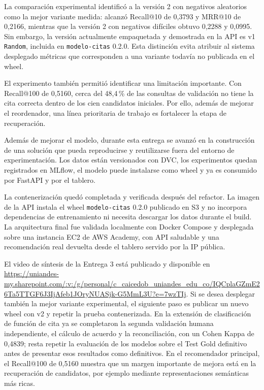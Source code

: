 \documentclass[9pt]{article}
\begin{document}
La comparación experimental identificó a la versión 2 con negativos aleatorios
como la mejor variante medida: alcanzó Recall@10 de 0,3793 y MRR@10 de 0,2166,
mientras que la versión 2 con negativos difíciles obtuvo 0,2288 y 0,0995. Sin
embargo, la versión actualmente empaquetada y demostrada en la API es v1
\texttt{Random}, incluida en \texttt{modelo-citas} 0.2.0. Esta distinción evita
atribuir al sistema desplegado métricas que corresponden a una variante todavía
no publicada en el wheel.

El experimento también permitió identificar una limitación importante. Con
Recall@100 de 0,5160, cerca del 48,4\,\% de las consultas de validación no tiene
la cita correcta dentro de los cien candidatos iniciales. Por ello, además de
mejorar el reordenador, una línea prioritaria de trabajo es fortalecer la etapa
de recuperación.

Además de mejorar el modelo, durante esta entrega se avanzó en la construcción
de una solución que pueda reproducirse y reutilizarse fuera del entorno de
experimentación. Los datos están versionados con DVC, los experimentos quedan
registrados en MLflow, el modelo puede instalarse como wheel y ya es consumido
por FastAPI y por el tablero.

La contenerización quedó completada y verificada después del refactor. La
imagen de la API instala el wheel \texttt{modelo-citas} 0.2.0 publicado en S3 y
no incorpora dependencias de entrenamiento ni necesita descargar los datos
durante el build. La arquitectura final fue validada localmente con Docker
Compose y desplegada sobre una instancia EC2 de AWS Academy, con API saludable y
una recomendación real devuelta desde el tablero servido por la IP pública.

El video de síntesis de la Entrega 3 está publicado y disponible en
\url{https://uniandes-my.sharepoint.com/:v:/g/personal/c_caicedob_uniandes_edu_co/IQCplaGZmE26Ta5TTGF6J3IjAfeb1JOryNUASjk-G5MmL3U?e=7wzTIj}.
Si se desea desplegar también la mejor variante experimental, el siguiente paso
es publicar un nuevo wheel con v2 y repetir la prueba contenerizada. En la
extensión de clasificación de función de cita ya se completaron la segunda
validación humana independiente, el cálculo de acuerdo y la reconciliación, con
un Cohen Kappa de 0,4839; resta repetir la evaluación de los modelos sobre el
Test Gold definitivo antes de presentar esos resultados como definitivos. En el recomendador principal, el Recall@100 de
0,5160 muestra que un margen importante de mejora está en la recuperación de
candidatos, por ejemplo mediante representaciones semánticas más ricas.
\end{document}
